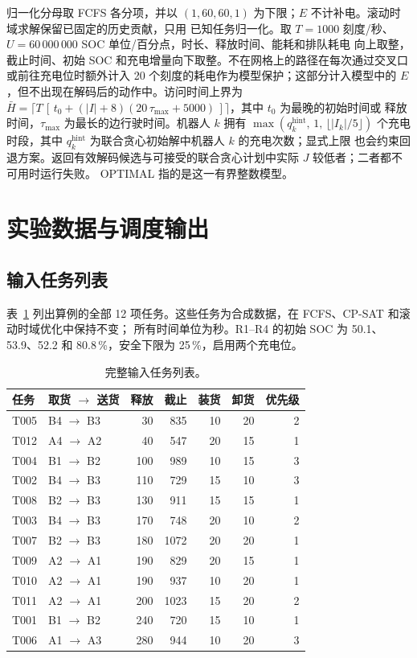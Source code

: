 \documentclass[11pt,a4paper,fontset=none]{ctexart}
\newcommand{\pct}{\,\%}
\begin{document}
归一化分母取 FCFS 各分项，并以 $(1, 60, 60, 1)$ 为下限；$E$ 不计补电。滚动时域求解保留已固定的历史贡献，只用
已知任务归一化。取 $T = 1000$ 刻度/秒、$U = 60\,000\,000$ SOC 单位/百分点，时长、释放时间、能耗和排队耗电
向上取整，截止时间、初始 SOC 和充电增量向下取整。不在网格上的路径在每次通过交叉口或前往充电位时额外计入
20 个刻度的耗电作为模型保护；这部分计入模型中的 $E$，但不出现在解码后的动作中。访问时间上界为
$\bar H = \lceil T\,[\,t_0 + (|I| + 8)(20\,\tau_{\max} + 5000)\,] \rceil$，其中 $t_0$ 为最晚的初始时间或
释放时间，$\tau_{\max}$ 为最长的边行驶时间。机器人 $k$ 拥有 $\max(q_k^{\text{hint}},\, 1,\, \lfloor |I_k|/5 \rfloor)$ 个充电时段，其中 $q_k^{\text{hint}}$ 为联合贪心初始解中机器人 $k$ 的充电次数；显式上限
也会约束回退方案。返回有效解码候选与可接受的联合贪心计划中实际 $J$ 较低者；二者都不可用时运行失败。
OPTIMAL 指的是这一有界整数模型。

\section{实验数据与调度输出}
\label{app:data}

\subsection{输入任务列表}

表~\ref{tab:tasklist} 列出算例的全部 12 项任务。这些任务为合成数据，在 FCFS、CP-SAT 和滚动时域优化中保持不变；
所有时间单位为秒。R1--R4 的初始 SOC 为 50.1、53.9、52.2 和 80.8\pct，安全下限为 25\pct，启用两个充电位。

\begin{table}[!htbp]
\centering\small
\caption{完整输入任务列表。}
\label{tab:tasklist}
\begin{tabular}{llrrrrr}
\toprule
任务 & 取货 $\to$ 送货 & 释放 & 截止 & 装货 & 卸货 & 优先级 \\
\midrule
T005 & B4 $\to$ B3 & 30 & 835 & 10 & 20 & 2 \\
T012 & A4 $\to$ A2 & 40 & 547 & 20 & 15 & 1 \\
T004 & B1 $\to$ B2 & 100 & 989 & 10 & 15 & 3 \\
T002 & B4 $\to$ B3 & 110 & 729 & 15 & 10 & 3 \\
T008 & B2 $\to$ B3 & 130 & 911 & 15 & 15 & 1 \\
T003 & B4 $\to$ B3 & 170 & 748 & 20 & 10 & 2 \\
T007 & B2 $\to$ B3 & 180 & 1072 & 20 & 20 & 1 \\
T009 & A2 $\to$ A1 & 190 & 829 & 20 & 15 & 1 \\
T010 & A2 $\to$ A1 & 190 & 937 & 10 & 20 & 1 \\
T011 & A2 $\to$ A1 & 200 & 1023 & 15 & 20 & 2 \\
T001 & B1 $\to$ B2 & 240 & 720 & 15 & 10 & 1 \\
T006 & A1 $\to$ A3 & 280 & 944 & 10 & 20 & 3 \\
\bottomrule
\end{tabular}
\end{table}
\end{document}
